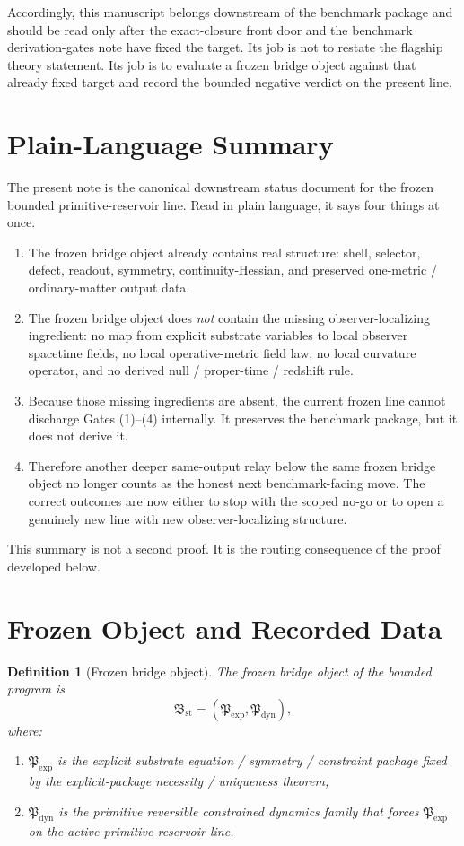 \documentclass[11pt]{article}
\newcommand{\ExplicitPackage}{\mathfrak P_{\mathrm{exp}}}
\newcommand{\PrimitiveFamily}{\mathfrak P_{\mathrm{dyn}}}
\newcommand{\StableBridgeObject}{\mathfrak B_{\mathrm{st}}}
\newtheorem{definition}{Definition}
\begin{document}
Accordingly, this manuscript belongs downstream of the benchmark package and should be read only after the exact-closure front door and the benchmark derivation-gates note have fixed the target. Its job is not to restate the flagship theory statement. Its job is to evaluate a frozen bridge object against that already fixed target and record the bounded negative verdict on the present line.

\section{Plain-Language Summary}

The present note is the canonical downstream status document for the frozen bounded primitive-reservoir line. Read in plain language, it says four things at once.
\begin{enumerate}
    \item The frozen bridge object already contains real structure: shell, selector, defect, readout, symmetry, continuity-Hessian, and preserved one-metric / ordinary-matter output data.
    \item The frozen bridge object does \emph{not} contain the missing observer-localizing ingredient: no map from explicit substrate variables to local observer spacetime fields, no local operative-metric field law, no local curvature operator, and no derived null / proper-time / redshift rule.
    \item Because those missing ingredients are absent, the current frozen line cannot discharge Gates (1)--(4) internally. It preserves the benchmark package, but it does not derive it.
    \item Therefore another deeper same-output relay below the same frozen bridge object no longer counts as the honest next benchmark-facing move. The correct outcomes are now either to stop with the scoped no-go or to open a genuinely new line with new observer-localizing structure.
\end{enumerate}

This summary is not a second proof. It is the routing consequence of the proof developed below.

\section{Frozen Object and Recorded Data}

\begin{definition}[Frozen bridge object]
\label{def:bridge}
The frozen bridge object of the bounded program is
\[
\StableBridgeObject=(\ExplicitPackage,\PrimitiveFamily),
\]
where:
\begin{enumerate}
    \item \(\ExplicitPackage\) is the explicit substrate equation / symmetry / constraint package fixed by the explicit-package necessity / uniqueness theorem;
    \item \(\PrimitiveFamily\) is the primitive reversible constrained dynamics family that forces \(\ExplicitPackage\) on the active primitive-reservoir line.
\end{enumerate}
\end{definition}
\end{document}
